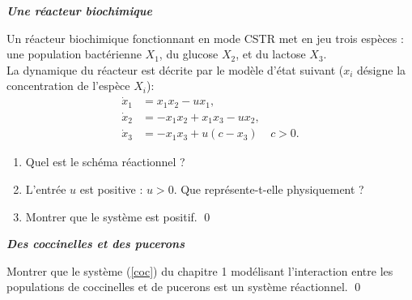 \begin{exercice}{\bf \em Une réacteur biochimique}

Un réacteur biochimique fonctionnant en mode CSTR met en jeu trois
espèces : une population bactérienne $X_1$, du glucose $X_2$,
et du lactose $X_3$.\\

La dynamique du réacteur est décrite par le modèle d'état suivant
($x_i$ désigne la concentration de l'espèce $X_i$): 
\begin{equation*} \begin{split}
\dot x_1 &= x_1x_2-ux_1,\\
\dot x_2 &= -x_1x_2 +x_1x_3 -ux_2,\\
\dot x_3 &= -x_1x_3 +u(c-x_3) \;\;\;\; c>0. 
\end{split} \end{equation*}

\begin{enumerate}
\item Quel est le schéma réactionnel ?
\item L'entrée $u$ est positive :  $u>0$.  Que représente-t-elle physiquement ?
\item Montrer que le système est positif. \qed
\end{enumerate}
\end{exercice}
\vv

\begin{exercice}{\bf \em Des coccinelles et des pucerons}

Montrer que le système (\ref{coc}) du chapitre 1 modélisant l'interaction entre les populations de coccinelles et de pucerons est un système réactionnel. \qed
\end{exercice}
\vv

